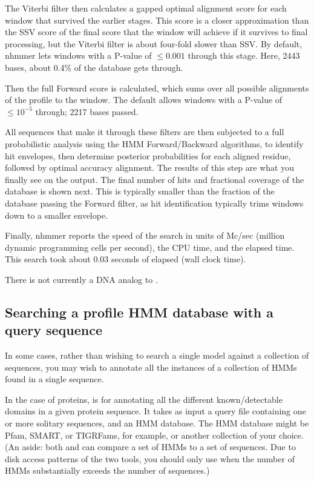 The Viterbi filter then calculates a gapped optimal alignment score for each
window that survived the earlier stages. This score is a closer approximation
than the SSV score of the final score that the window will achieve if it
survives to final processing, but the Viterbi filter is about four-fold slower
than SSV. By default, nhmmer lets windows with a P-value of $\leq 0.001$ 
through this stage. Here, 2443 bases, about 0.4\% of the database gets through.

Then the full Forward score is calculated, which sums over all
possible alignments of the profile to the window. The default
allows windows with a P-value of $\leq 10^{-5}$ through; 2217 bases
passed.

All sequences that make it through these filters are
then subjected to a full probabilistic analysis using the HMM
Forward/Backward algorithms, to identify hit envelopes, then determine
posterior probabilities for each aligned residue, followed by optimal
accuracy alignment. The results of this step are what you finally see on
the output. The final number of hits and fractional coverage of the 
database is shown next. This is typically smaller than the fraction of the
database passing the Forward filter, as hit identification typically trims
windows down to a smaller envelope.

Finally, nhmmer reports the speed of the search in units of Mc/sec
(million dynamic programming cells per second), the CPU time, and the
elapsed time. This search took about 0.03 seconds of elapsed (wall
clock time). 

There is not currently a DNA analog to . 



\subsection{Searching a profile HMM database with a query sequence}

In some cases, rather than wishing to search a single model against a collection
of sequences, you may wish to annotate all the instances of a collection of HMMs
found in a single sequence.

In the case of proteins,  is for annotating all the different
known/detectable domains in a given protein sequence. It takes as input 
a query file containing one or more solitary sequences, and an HMM database.
The HMM database might be Pfam, SMART, or TIGRFams, for example, or another 
collection of your choice. (An aside: both  and
 can compare a set of HMMs to a set of sequences. Due to
disk access patterns of the two tools, you should
only use  when the number of HMMs substantially exceeds the 
number of sequences.)

